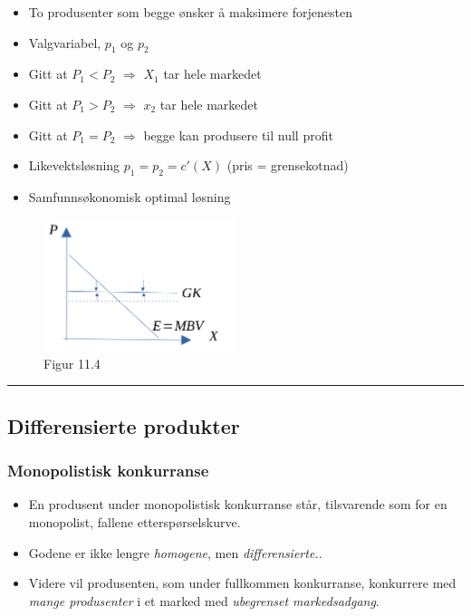 \documentclass[
  letterpaper,
  DIV=11,
  numbers=noendperiod]{scrartcl}
\providecommand{\tightlist}{%
  \setlength{\itemsep}{0pt}\setlength{\parskip}{0pt}}\usepackage{longtable,booktabs,array}
\begin{document}
\begin{itemize}
\tightlist
\item
  To produsenter som begge ønsker å maksimere forjenesten
\item
  Valgvariabel, \(p_{1}\) og \(p_{2}\)
\item
  Gitt at \(P_{1}<P_{2}\) \(\Rightarrow\) \(X_{1}\) tar hele markedet
\item
  Gitt at \(P_{1}>P_{2}\) \(\Rightarrow\) \(x_{2}\) tar hele markedet
\item
  Gitt at \(P_{1}=P_{2}\) \(\Rightarrow\) begge kan produsere til null
  profit
\item
  Likevektsløsning \(p_{1}=p_{2}=c'(X)\) (pris = grensekotnad)
\item
  Samfunnsøkonomisk optimal løsning
\end{itemize}

\begin{figure}[H]

{\centering \includegraphics[width=0.5\textwidth,height=\textheight]{drawio/bertrandl.png}

}

\caption{Figur 11.4}

\end{figure}%

\begin{center}\rule{0.5\linewidth}{0.5pt}\end{center}

\subsection{Differensierte produkter}\label{differensierte-produkter}

\subsubsection{Monopolistisk
konkurranse}\label{monopolistisk-konkurranse}

\begin{itemize}
\tightlist
\item
  En produsent under monopolistisk konkurranse står, tilsvarende som for
  en monopolist, fallene etterspørselskurve.
\item
  Godene er ikke lengre \emph{homogene}, men \emph{differensierte.}.
\item
  Videre vil produsenten, som under fullkommen konkurranse, konkurrere
  med \emph{mange produsenter} i et marked med \emph{ubegrenset
  markedsadgang}.
\end{itemize}
\end{document}
